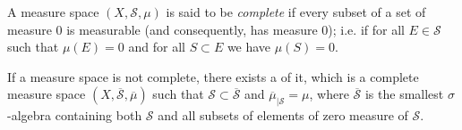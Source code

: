 \documentclass[12pt]{article}
\begin{document}
A measure space $(X,\mathscr{S},\mu)$ is said to be \emph{complete} if every subset of a set of measure $0$ is measurable (and consequently, has measure $0$); i.e. if for all $E\in\mathscr{S}$ such that $\mu(E)=0$ and for all $S\subset E$ we have $\mu(S)=0$. 

If a measure space is not complete, there exists a  of it, which is a complete measure space $(X,\overline{\mathscr{S}},\overline{\mu})$ such that $\mathscr{S}\subset\overline{\mathscr{S}}$ and $\overline {\mu}_{|\mathscr{S}} = \mu$, where $\overline{\mathscr{S}}$ is the smallest $\sigma$-algebra containing both $\mathscr{S}$ and all subsets of elements of zero measure of $\mathscr{S}$.
\end{document}
